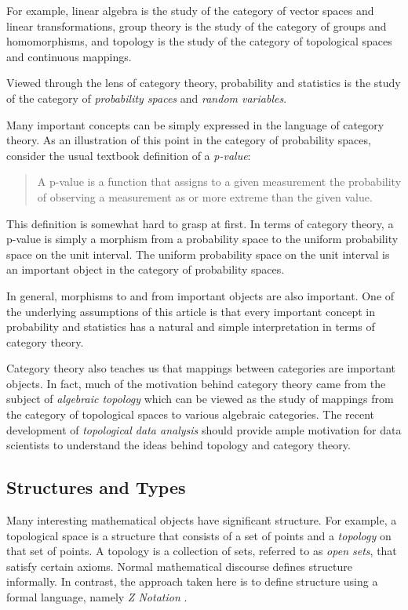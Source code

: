 \documentclass{article}
\begin{document}
For example, linear algebra is the study of the category of vector spaces and linear transformations,
group theory is the study of the category of groups and homomorphisms, and
topology is the study of the category of topological spaces and continuous mappings.

Viewed through the lens of category theory, probability and statistics is the study of the category of {\it probability spaces}
and {\it random variables}.

Many important concepts can be simply expressed in the language of category theory.
As an illustration of this point in the category of probability spaces, consider the usual textbook definition of a {\it p-value}:

\begin{quotation}
A p-value is a function that assigns to a given measurement the probability of observing a measurement as or more extreme than the given value.
\end{quotation}

This definition is somewhat hard to grasp at first.
In terms of category theory, a p-value is simply a morphism from a probability space to the uniform probability space on the unit interval.
The uniform probability space on the unit interval is an important object in the category of probability spaces.

In general, morphisms to and from important objects are also important.
One of the underlying assumptions of this article is that every important concept in probability and statistics has a natural and simple interpretation in terms of  category theory.

Category theory also teaches us that mappings between categories are important objects.
In fact, much of the motivation behind category theory came from the subject of {\it algebraic topology} which can be viewed as the study of mappings from the category of topological spaces to various algebraic categories.
The recent development of {\it topological data analysis} should provide ample motivation for data scientists to understand the ideas behind topology and category theory.

\subsection{Structures and Types}

Many interesting mathematical objects have significant structure. 
For example, a topological space is a structure that consists of a set of points and a {\it topology} on that set of points.
A topology is a collection of sets, referred to as {\it open sets}, that satisfy certain axioms.
Normal mathematical discourse defines structure informally.
In contrast, the approach taken here is to define structure using a formal language, namely {\it Z Notation} \cite{spivey:zrm}.
\end{document}
